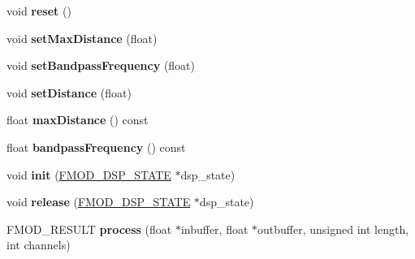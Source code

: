 \begin{DoxyCompactItemize}
\item 
\hypertarget{class_f_m_o_d_distance_filter_state_a1245b63fe25cff3a01947cef2607c458}{void {\bfseries reset} ()}\label{class_f_m_o_d_distance_filter_state_a1245b63fe25cff3a01947cef2607c458}

\item 
\hypertarget{class_f_m_o_d_distance_filter_state_a6f92af6db08e816364e396b277c37adf}{void {\bfseries set\+Max\+Distance} (float)}\label{class_f_m_o_d_distance_filter_state_a6f92af6db08e816364e396b277c37adf}

\item 
\hypertarget{class_f_m_o_d_distance_filter_state_a6073b56f7406954dce87185d41fbf0e6}{void {\bfseries set\+Bandpass\+Frequency} (float)}\label{class_f_m_o_d_distance_filter_state_a6073b56f7406954dce87185d41fbf0e6}

\item 
\hypertarget{class_f_m_o_d_distance_filter_state_a80372dcee050d2ce810c3494180e8070}{void {\bfseries set\+Distance} (float)}\label{class_f_m_o_d_distance_filter_state_a80372dcee050d2ce810c3494180e8070}

\item 
\hypertarget{class_f_m_o_d_distance_filter_state_ab5d10610be49d56a2ba1df4c74186e3f}{float {\bfseries max\+Distance} () const }\label{class_f_m_o_d_distance_filter_state_ab5d10610be49d56a2ba1df4c74186e3f}

\item 
\hypertarget{class_f_m_o_d_distance_filter_state_a2705c2f8e2f3594e2e5c31c8e20cdc6d}{float {\bfseries bandpass\+Frequency} () const }\label{class_f_m_o_d_distance_filter_state_a2705c2f8e2f3594e2e5c31c8e20cdc6d}

\item 
\hypertarget{class_f_m_o_d_distance_filter_state_a0a56dad970e746050f309b3c85acc765}{void {\bfseries init} (\hyperlink{struct_f_m_o_d___d_s_p___s_t_a_t_e}{F\+M\+O\+D\+\_\+\+D\+S\+P\+\_\+\+S\+T\+A\+T\+E} $\ast$dsp\+\_\+state)}\label{class_f_m_o_d_distance_filter_state_a0a56dad970e746050f309b3c85acc765}

\item 
\hypertarget{class_f_m_o_d_distance_filter_state_aed67207c94bbdfc4cb4f12a29f8262b6}{void {\bfseries release} (\hyperlink{struct_f_m_o_d___d_s_p___s_t_a_t_e}{F\+M\+O\+D\+\_\+\+D\+S\+P\+\_\+\+S\+T\+A\+T\+E} $\ast$dsp\+\_\+state)}\label{class_f_m_o_d_distance_filter_state_aed67207c94bbdfc4cb4f12a29f8262b6}

\item 
\hypertarget{class_f_m_o_d_distance_filter_state_a3671cc21ae559f6b422553ffaced9df6}{F\+M\+O\+D\+\_\+\+R\+E\+S\+U\+L\+T {\bfseries process} (float $\ast$inbuffer, float $\ast$outbuffer, unsigned int length, int channels)}\label{class_f_m_o_d_distance_filter_state_a3671cc21ae559f6b422553ffaced9df6}


\end{DoxyCompactItemize}
